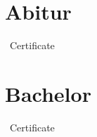 \documentclass[11pt,a4paper]{moderncv}
\begin{document}
	
	\newpage
	\chapter{Abitur}{~Certificate}
	\vspace*{0.5cm}
	\begin{center}
	\end{center}

	\newpage
	\chapter{Bachelor}{~Certificate}
	\vspace*{0.5cm}
	\begin{center}
	\end{center}
	
	\newpage
\end{document}
